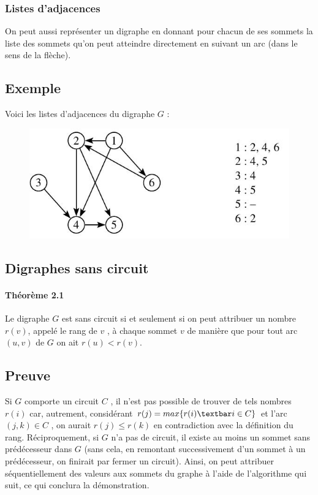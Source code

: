 \subsubsection{ Listes d'adjacences}
On peut aussi représenter un digraphe en donnant pour chacun de ses sommets la liste des
sommets qu'on peut atteindre directement en suivant un arc (dans le sens de la flèche).
\subsection*{Exemple}
Voici les listes d'adjacences du digraphe $  G $ :
\begin{figure}[h]
\centering
\includegraphics[width=0.6\linewidth]{images/graph24}
\end{figure}

\subsection{Digraphes sans circuit}
\paragraph*{Théorème 2.1}
Le digraphe $ G $ est sans circuit si et seulement si on peut attribuer un nombre $ r(v) $,
appelé le rang de $ v$ , à chaque sommet $ v $ de manière que pour tout arc $ (u, v) $ de $ G$  on ait
$ r(u) < r(v) $.

\subsection*{Preuve}
Si $ G $ comporte un circuit $ C $ , il n'est pas possible de trouver de tels nombres $ r(i) $ car,
autrement, considérant $ r(j) = max\{ r(i) \textbar i \in C\} $ et l'arc $ ( j, k) \in C $ , on aurait $ r(j) \leq r(k) $
en contradiction avec la définition du rang.
Réciproquement, si $ G $ n'a pas de circuit, il existe au moins un sommet sans prédécesseur
dans $ G $ (sans cela, en remontant successivement d'un sommet à un prédécesseur, on finirait
par fermer un circuit). Ainsi, on peut attribuer séquentiellement des valeurs aux sommets
du graphe à l'aide de l'algorithme qui suit, ce qui conclura la démonstration.

